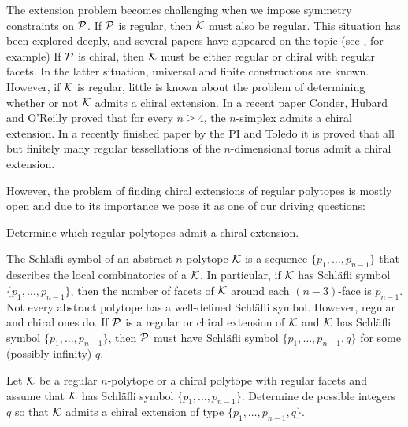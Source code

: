 The extension problem becomes challenging when we impose symmetry constraints on $\mathcal{P}$. 
If $\mathcal{P}$ is regular, then $\mathcal{K}$ must also be regular.
This situation has been explored deeply, and several papers have appeared on the topic 
(see \cite{Pellicer2010_ExtensionsDuallyBipartite,Pellicer2009_ExtensionsRegularPolytopes,Schulte1985_ExtensionsRegularComplexes,Schulte1983_ArrangingRegularIncidence,Schulte1990_ClassAbstractPolytopes, Danzer1984_RegularIncidenceComplexes}, for example)
If $\mathcal{P}$ is chiral, then $\mathcal{K}$ must be either regular or chiral with regular facets.
In the latter situation, universal \cite{SchulWeiss1995_FreeExtensionsChiral} and finite \cite{CunniPelli2014_ChiralExtensionsChiral,Montero2021_SchlaefliSymbolChiral} constructions are known.
However, if $\mathcal{K}$ is regular, little is known about the problem of determining whether or not $\mathcal{K}$ admits a chiral extension.
In a recent paper \cite{CondHubORe2024_ConstructionChiralPolytopes} Conder, Hubard and O'Reilly proved that for every $n \geq 4$, the $n$-simplex admits a chiral extension.
In a recently finished paper by the PI and Toledo \cite{MonteToled_ChiralExtensionsRegular_preprint} it is proved that all but finitely many regular tessellations of the $n$-dimensional torus admit a chiral extension.

However, the problem of finding chiral extensions of regular polytopes is mostly open and due to its importance we pose it as one of our driving questions:

\begin{problem}\label{prob:chirExt}
  Determine which regular polytopes admit a chiral extension.
 \end{problem}
 
 The Schläfli symbol of an abstract $n$-polytope $\mathcal{K}$ is a sequence $\{p_{1}, \dots, p_{n-1}\}$ that describes the local combinatorics of a $\mathcal{K}$. 
 In particular, if $\mathcal{K}$ has Schläfli symbol $\{p_{1}, \dots, p_{n-1}\}$, then the number of facets of $\mathcal{K}$ around each $(n-3)$-face is $p_{n-1}$.
Not every abstract polytope has a well-defined Schläfli symbol. However, regular and chiral ones do. 
If $\mathcal{P}$ is a regular or chiral extension of $\mathcal{K}$ and $\mathcal{K}$ has Schläfli symbol $\{p_{1}, \dots, p_{n-1}\}$, then $\mathcal{P}$ must have Schläfli symbol $\{p_{1}, \dots, p_{n-1}, q\}$ for some (possibly infinity) $q$.

\begin{problem} \label{prob:chirExtType}
  Let $\mathcal{K}$ be a regular $n$-polytope or a chiral polytope with regular facets and assume that $\mathcal{K}$ has Schläfli symbol $\{p_{1}, \dots, p_{n-1}\}$. Determine de possible integers $q$ so that $\mathcal{K}$ admits a chiral extension of type $\{p_{1}, \dots, p_{n-1}, q\}$.
\end{problem}

